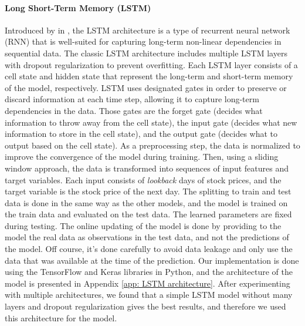 \documentclass[12pt]{article}
\theoremstyle{definition}
\begin{document}
\paragraph{Long Short-Term Memory (LSTM)}
Introduced by \citeauthor{hochreiter1997long} in \cite{hochreiter1997long}, the LSTM architecture is a type of recurrent neural network (RNN) that is well-suited for capturing long-term non-linear dependencies in sequential data.
The classic LSTM architecture includes multiple LSTM layers with dropout regularization to prevent overfitting. 
Each LSTM layer consists of a cell state and hidden state that represent the long-term and short-term memory of the model, respectively.
LSTM uses designated gates in order to preserve or discard information at each time step, allowing it to capture long-term dependencies in the data.
Those gates are the forget gate (decides what information to throw away from the cell state), the input gate (decides what new information to store in the cell state), and the output gate (decides what to output based on the cell state).
As a preprocessing step, the data is normalized to improve the convergence of the model during training.
Then, using a sliding window approach, the data is transformed into sequences of input features and target variables.
Each input consists of \textit{lookback} days of stock prices, and the target variable is the stock price of the next day.
The splitting to train and test data is done in the same way as the other models, and the model is trained on the train data and evaluated on the test data.
The learned parameters are fixed during testing.
The online updating of the model is done by providing to the model the real data as observations in the test data, and not the predictions of the model.
Off course, it's done carefully to avoid data leakage and only use the data that was available at the time of the prediction.
Our implementation is done using the TensorFlow and Keras libraries in Python, and the architecture of the model is presented in Appendix \ref{app: LSTM architecture}.
After experimenting with multiple architectures, we found that a simple LSTM model without many layers and dropout regularization gives the best results, and therefore we used this architecture for the model. 
\end{document}
